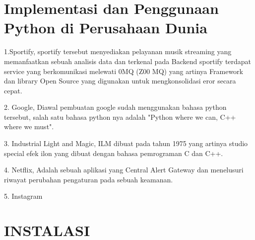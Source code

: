 \documentclass{article}
\begin{document}
\section{Implementasi dan Penggunaan Python di Perusahaan Dunia}
\hspace{1 cm}{Adapun 5 perusahaan yang menggunakan bahasa python didunia yang berfungsi untuk memecahkan suatu masalah yang rumit dan membuat suatu aplikasi yang top dan terkenal, salah satu 5 perusahaan tersebut yaitu: }
\item 1.{Sportify, sportify tersebut menyediakan pelayanan musik streaming yang memanfaatkan sebuah analisis data dan terkenal pada Backend sportify terdapat service yang berkomunikasi melewati 0MQ (Z00 MQ) yang artinya Framework dan library Open Source yang digunakan untuk mengkonsolidasi eror secara cepat.}
\item 2. {Google, Diawal pembuatan google sudah menggunakan bahasa python tersebut, salah satu bahasa python nya adalah "Python where we can, C++ where we must".}
\item 3. {Industrial Light and Magic, ILM dibuat pada tahun 1975 yang artinya studio special efek ilon yang dibuat dengan bahasa pemrograman C dan C++.}
\item 4. {Netflix, Adalah sebuah aplikasi yang Central Alert Gateway dan menelusuri riwayat perubahan pengaturan pada sebuah keamanan.}
\item 5. {Instagram}

\newpage
\section{INSTALASI}
\end{document}
